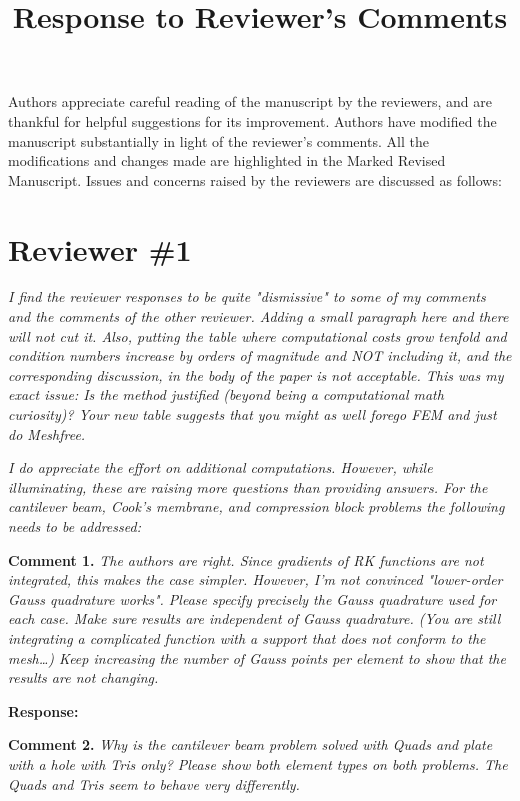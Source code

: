 \documentclass{article}
\title{Response to Reviewer's Comments}
\author{}
\date{}
\begin{document}
\maketitle

Authors appreciate careful reading of the manuscript by the reviewers, and are thankful for helpful suggestions for its improvement. Authors have modified the manuscript substantially in light of the reviewer's comments. All the modifications and changes made are highlighted in the Marked Revised Manuscript. Issues and concerns raised by the reviewers are discussed as follows:

\section*{Reviewer \#1}
\textit{I find the reviewer responses to be quite "dismissive" to some of my comments and the comments of the other reviewer. Adding a small paragraph here and there will not cut it. Also, putting the table where computational costs grow tenfold and condition numbers increase by orders of magnitude and NOT including it, and the corresponding discussion, in the body of the paper is not acceptable. This was my exact issue: Is the method justified (beyond being a computational math curiosity)? Your new table suggests that you might as well forego FEM and just do Meshfree.}

\textit{I do appreciate the effort on additional computations. However, while illuminating, these are raising more questions than providing answers. For the cantilever beam, Cook's membrane, and compression block problems the following needs to be addressed:}

\textbf{Comment 1.} \textit{The authors are right. Since gradients of RK functions are not integrated, this makes the case simpler. However, I'm not convinced "lower-order Gauss quadrature works". Please specify precisely the Gauss quadrature used for each case. Make sure results are independent of Gauss quadrature. (You are still integrating a complicated function with a support that does not conform to the mesh…) Keep increasing the number of Gauss points per element to show that the results are not changing.}

\textbf{Response:} 

\textbf{Comment 2.} \textit{Why is the cantilever beam problem solved with Quads and plate with a hole with Tris only? Please show both element types on both problems. The Quads and Tris seem to behave very differently.}
\end{document}
